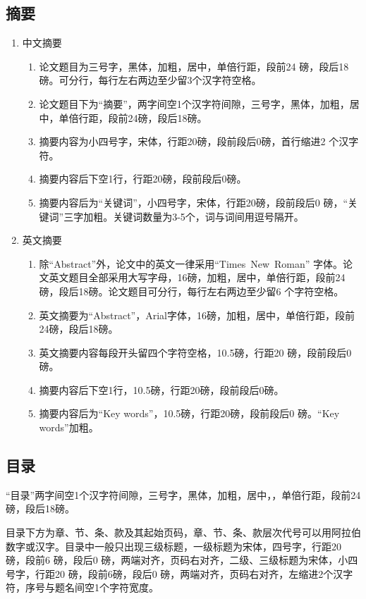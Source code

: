 \documentclass[twoside,longtitle]{LZUthesis}
\begin{document}
\subsection{摘要}
\begin{enumerate}
\item 中文摘要

\begin{enumerate}
\item 论文题目为三号字，黑体，加粗，居中，单倍行距，段前24 磅，段后18 磅。可分行，每行左右两边至少留3个汉字符空格。
\item 论文题目下为“摘要”，两字间空1个汉字符间隙，三号字，黑体，加粗，居中，单倍行距，段前24磅，段后18磅。
\item 摘要内容为小四号字，宋体，行距20磅，段前段后0磅，首行缩进2 个汉字符。
\item 摘要内容后下空1行，行距20磅，段前段后0磅。
\item 摘要内容后为“关键词”，小四号字，宋体，行距20磅，段前段后0 磅，“关键词”三字加粗。关键词数量为3-5个，词与词间用逗号隔开。
\end{enumerate}
\item 英文摘要

\begin{enumerate}
\item 除“Abstract”外，论文中的英文一律采用“Times~New~Roman” 字体。论文英文题目全部采用大写字母，16磅，加粗，居中，单倍行距，段前24 磅，段后18磅。论文题目可分行，每行左右两边至少留6 个字符空格。
\item 英文摘要为“Abstract”，Arial字体，16磅，加粗，居中，单倍行距，段前24磅，段后18磅。
\item 英文摘要内容每段开头留四个字符空格，10.5磅，行距20 磅，段前段后0 磅。
\item 摘要内容后下空1行，10.5磅，行距20磅，段前段后0磅。
\item 摘要内容后为“Key words”，10.5磅，行距20磅，段前段后0 磅。“Key words”加粗。
\end{enumerate}
\end{enumerate}

\subsection{目录}

“目录”两字间空1个汉字符间隙，三号字，黑体，加粗，居中，，单倍行距，段前24 磅，段后18磅。

目录下方为章、节、条、款及其起始页码，章、节、条、款层次代号可以用阿拉伯数字或汉字。目录中一般只出现三级标题，一级标题为宋体，四号字，行距20 磅，段前6 磅，段后0 磅，两端对齐，页码右对齐，二级、三级标题为宋体，小四号字，行距20 磅，段前6磅，段后0 磅，两端对齐，页码右对齐，左缩进2个汉字符，序号与题名间空1个字符宽度。
\end{document}
